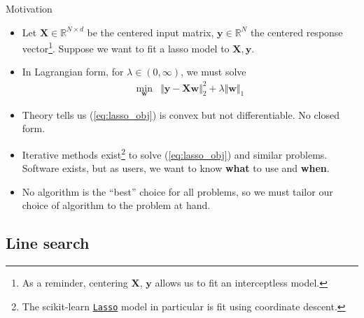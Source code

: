 \documentclass{beamer}
\numberwithin{equation}{section}
\newcommand{\aref}[1]{\alert{\ref{#1}}}
\newcommand{\ahref}[2]{\href{#1}{\alert{#2}}}
\begin{document}
\begin{frame}{Motivation}
    \begin{itemize}
        \item
        Let $ \mathbf{X} \in \mathbb{R}^{N \times d} $ be the centered input
        matrix, $ \mathbf{y} \in \mathbb{R}^N $ the centered response
        vector\footnote{
            As a reminder, centering $ \mathbf{X} $, $ \mathbf{y} $ allows us
            to fit an interceptless model.
        }.
        Suppose we want to fit a lasso model to $ \mathbf{X}, \mathbf{y} $.

        \item
        In Lagrangian form, for $ \lambda \in (0, \infty) $, we must solve
        \begin{equation} \label{eq:lasso_obj}
            \begin{array}{ll}
                \displaystyle\min_\mathbf{w} &
                \Vert\mathbf{y} - \mathbf{Xw}\Vert_2^2 +
                \lambda\Vert\mathbf{w}\Vert_1
            \end{array}
        \end{equation}

        \item
        Theory tells us (\aref{eq:lasso_obj}) is convex but not
        differentiable. No closed form.

        \item
        Iterative methods exist\footnote{
            The scikit-learn \ahref{%
                https://scikit-learn.org/stable/modules/generated/%
                sklearn.linear_model.Lasso.html%
            }{\texttt{Lasso}} model in particular is fit using
            coordinate descent.
        } to solve (\aref{eq:lasso_obj}) and similar
        problems. Software exists, but as users, we want to know \textbf{what}
        to use and \textbf{when}.

        \item
        \alert{
            No algorithm is the ``best'' choice for all problems, so we must
            tailor our choice of algorithm to the problem at hand.
        }
    \end{itemize}
\end{frame}

\subsection{Line search}
\end{document}
